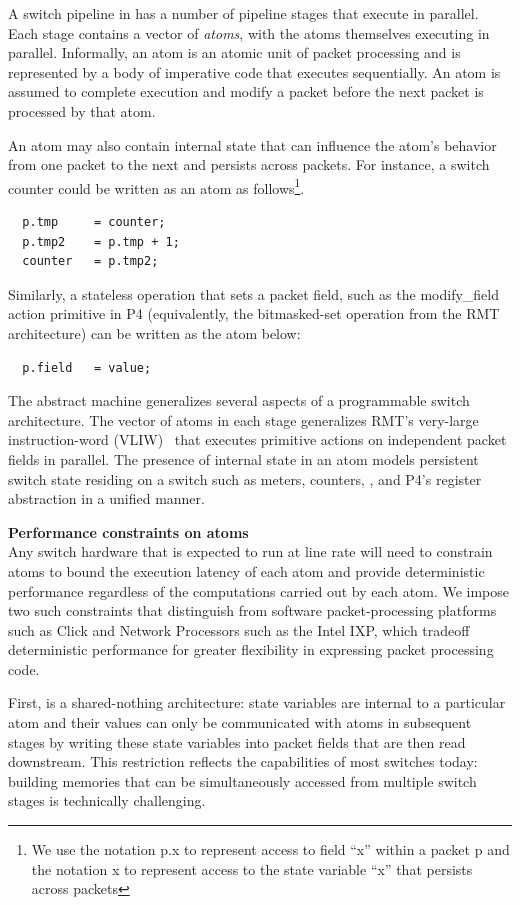 A switch pipeline in \absmachine has a number of pipeline stages that execute in
parallel. Each stage contains a vector of \textit{atoms}, with the atoms
themselves executing in parallel. Informally, an atom is an atomic unit of
packet processing and is represented by a body of imperative code that executes
sequentially. An atom is assumed to complete execution and modify a packet
before the next packet is processed by that atom.

An atom may also contain internal state that can influence the atom's behavior
from one packet to the next and persists across packets. For instance, a switch
counter could be written as an atom as follows\footnote{We use the notation p.x
  to represent access to field ``x'' within a packet p and the notation x to
represent access to the state variable ``x'' that persists across packets}.
\begin{verbatim}
  p.tmp     = counter;
  p.tmp2    = p.tmp + 1;
  counter   = p.tmp2;
\end{verbatim}
Similarly, a stateless operation that sets a packet field, such as the
modify\_field action primitive in P4 (equivalently, the bitmasked-set operation
from the RMT architecture) can be written as the atom below:
\begin{verbatim}
  p.field   = value;
\end{verbatim}

The \absmachine abstract machine generalizes several aspects of a programmable
switch architecture. The vector of atoms in each stage generalizes RMT's
very-large instruction-word (VLIW)~\cite{rmt} that executes primitive actions
on independent packet fields in parallel. The presence of internal state in an
atom models persistent switch state residing on a switch such as meters,
counters, , and P4's register abstraction in a unified manner.

\textbf{Performance constraints on atoms} \\

Any switch hardware that is expected to run at line rate will need to constrain
atoms to bound the execution latency of each atom and provide deterministic
performance regardless of the computations carried out by each atom. We impose
two such constraints that distinguish \absmachine from software packet-processing
platforms such as Click and Network Processors such as the Intel IXP, which
tradeoff deterministic performance for greater flexibility in expressing packet
processing code.

First, \absmachine is a shared-nothing architecture: state variables are internal to
a particular atom and their values can only be communicated with atoms in
subsequent stages by writing these state variables into packet fields that are
then read downstream.  This restriction reflects the capabilities of most
switches today: building memories that can be simultaneously accessed from
multiple switch stages is technically challenging.

